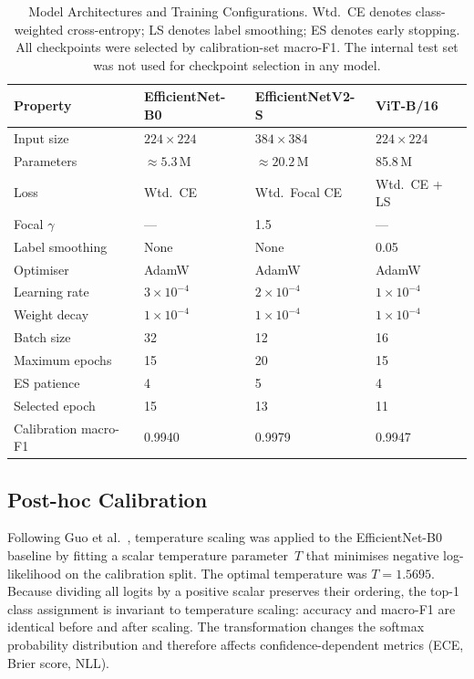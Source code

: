 \documentclass[conference]{IEEEtran}
\begin{document}
\begin{table}[!t]
\caption{Model Architectures and Training Configurations. Wtd.\ CE
denotes class-weighted cross-entropy; LS denotes label smoothing; ES
denotes early stopping. All checkpoints were selected by
calibration-set macro-F1. The internal test set was not used for
checkpoint selection in any model.}
\label{tab:architecture}
\centering
\small
\setlength{\tabcolsep}{5pt}
\renewcommand{\arraystretch}{1.12}
\begin{tabularx}{\textwidth}{L Y Y Y}
\toprule
\textbf{Property} & \textbf{EfficientNet-B0} & \textbf{EfficientNetV2-S} & \textbf{ViT-B/16} \\
\midrule
Input size & $224\times224$ & $384\times384$ & $224\times224$ \\
Parameters & $\approx 5.3$\,M & $\approx 20.2$\,M & 85.8\,M \\
Loss & Wtd.\ CE & Wtd.\ Focal CE & Wtd.\ CE + LS \\
Focal $\gamma$ & --- & 1.5 & --- \\
Label smoothing & None & None & 0.05 \\
Optimiser & AdamW & AdamW & AdamW \\
Learning rate & $3\times10^{-4}$ & $2\times10^{-4}$ & $1\times10^{-4}$ \\
Weight decay & $1\times10^{-4}$ & $1\times10^{-4}$ & $1\times10^{-4}$ \\
Batch size & 32 & 12 & 16 \\
Maximum epochs & 15 & 20 & 15 \\
ES patience & 4 & 5 & 4 \\
Selected epoch & 15 & 13 & 11 \\
Calibration macro-F1 & 0.9940 & 0.9979 & 0.9947 \\
\bottomrule
\end{tabularx}
\end{table}

\subsection{Post-hoc Calibration}

Following Guo et al.~\cite{guo2017calibration}, temperature scaling
was applied to the EfficientNet-B0 baseline by fitting a scalar
temperature parameter~$T$ that minimises negative log-likelihood on
the calibration split. The optimal temperature was
$T\!=\!1.5695$. Because dividing all logits by a positive scalar
preserves their ordering, the top-1 class assignment is invariant to
temperature scaling: accuracy and macro-F1 are identical before and
after scaling. The transformation changes the softmax probability
distribution and therefore affects confidence-dependent metrics
(ECE, Brier score, NLL).
\end{document}
